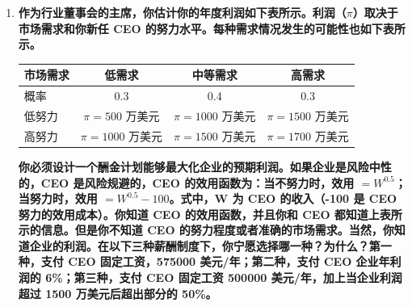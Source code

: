 \begin{enumerate}[label=\textbf{\arabic*.}, leftmargin=*]
		[iv] 综上所述，哈里提供一年保修绝非一个好主意。因为对手的理性策略是选择模仿，这会迫使博弈收敛于糟糕的混同均衡，最终导致哈里的发信利润被完全剥蚀至零。
		
		（2）当保修期延长至两年时，若刘氏强行模仿，其利润将大幅萎缩至 $8500 - 5000 - 1000 \times 2 = 1500$ 美元。由于该收益低于其放弃发信时的诚实利润 2000 美元，刘氏将失去模仿动机。市场由此达成完美的风险分离均衡，哈里成功向市场传递了高质量的真实信号，并获取 $10000 - 8000 - 500 \times 2 = 1000$ 美元的净利润。
		
		若保修期盲目延长至三年，哈里在分离均衡下的利润将进一步缩减至 $10000 - 8000 - 500 \times 3 = 500$ 美元。由于该利润已退化到与不发出任何信号时的原始混同利润完全相等，哈里在边际上将失去继续延长保修期的经济动力。
		
		（3）在广告策划中，应当鼓动哈里车行提供精准为 1.5 年的保修期限。为了成功阻断低质对手的伪造企图，保修期 $t$ 的设定必须满足刘氏车行的激励相容约束，即模仿收益不得超过其诚实收益。
		\[
		\begin{aligned}
			8500 - 5000 - 1000t &\le 7000 - 5000 \\
			3500 - 1000t &\le 2000 \\
			1000t &\ge 1500 \implies t \ge 1.5
		\end{aligned}
		\]
		当保修期精确设定为 1.5 年时，刘氏车行模仿的边际净收益刚好归零，从而被迫退出信号市场的竞争。这不仅能以最低的发信成本建立起坚固的高质量隔离防线，还能最大化哈里车行自身的利润留存。
		
		\item \textbf{作为行业董事会的主席，你估计你的年度利润如下表所示。利润（$\pi$）取决于市场需求和你新任 CEO 的努力水平。每种需求情况发生的可能性也如下表所示。}
		
		\begin{center}
			\small
			\renewcommand{\arraystretch}{1.3}
			\setlength{\tabcolsep}{6pt}
			\begin{tabular}{lccc}
				\hline
				市场需求 & 低需求 & 中等需求 & 高需求 \\ \hline
				概率 & 0.3 & 0.4 & 0.3 \\
				低努力 & $\pi = 500$ 万美元 & $\pi = 1000$ 万美元 & $\pi = 1500$ 万美元 \\
				高努力 & $\pi = 1000$ 万美元 & $\pi = 1500$ 万美元 & $\pi = 1700$ 万美元 \\ \hline
			\end{tabular}
		\end{center}
		
		\textbf{你必须设计一个酬金计划能够最大化企业的预期利润。如果企业是风险中性的，CEO 是风险规避的，CEO 的效用函数为：当不努力时，效用 $= W^{0.5}$；当努力时，效用 $= W^{0.5} - 100$。式中，W 为 CEO 的收入（-100 是 CEO 努力的效用成本）。你知道 CEO 的效用函数，并且你和 CEO 都知道上表所示的信息。但是你不知道 CEO 的努力程度或者准确的市场需求。当然，你知道企业的利润。在以下三种薪酬制度下，你宁愿选择哪一种？为什么？第一种，支付 CEO 固定工资，575000 美元/年；第二种，支付 CEO 企业年利润的 6\%；第三种，支付 CEO 固定工资 500000 美元/年，加上当企业利润超过 1500 万美元后超出部分的 50\%。}
		

\end{enumerate}
